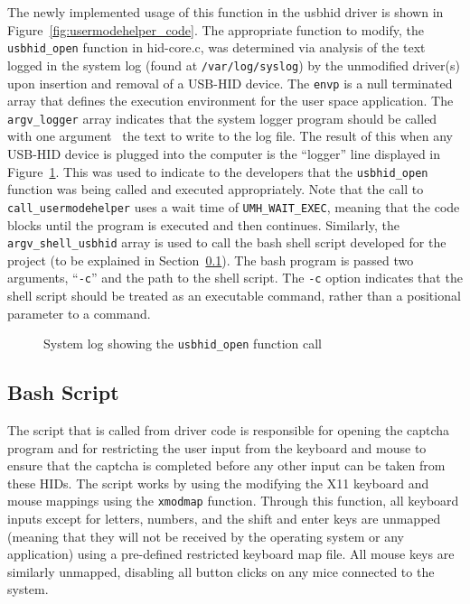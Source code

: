 \documentclass[pagenumbers]{ieee}
\begin{document}
The newly implemented usage of this function in the usbhid driver is shown in Figure~\ref{fig:usermodehelper_code}. The appropriate function to modify, the \texttt{usbhid\_open} function in hid-core.c, was determined via analysis of the text logged in the system log (found at \texttt{/var/log/syslog}) by the unmodified driver(s) upon insertion and removal of a USB-HID device. The \texttt{envp} is a null terminated array that defines the execution environment for the user space application. The \texttt{argv\_logger} array indicates that the system logger program should be called with one argument \textemdash \ the text to write to the log file. The result of this when any USB-HID device is plugged into the computer is the ``logger'' line displayed in  Figure~\ref{fig:syslog}. This was used to indicate to the developers that the \texttt{usbhid\_open} function was being called and executed appropriately. Note that the call to \texttt{call\_usermodehelper} uses a wait time of \texttt{UMH\_WAIT\_EXEC}, meaning that the code blocks until the program is executed and then continues. Similarly, the \texttt{argv\_shell\_usbhid} array is used to call the bash shell script developed for the project (to be explained in Section~\ref{section:bash}). The bash program is passed two arguments, ``\texttt{-c}'' and the path to the shell script. The \texttt{-c} option indicates that the shell script should be treated as an executable command, rather than a positional parameter to a command.

\begin{figure}[H]
   \caption{System log showing the \texttt{usbhid\_open} function call}
   \label{fig:syslog}
\end{figure}


\subsection{Bash Script}
\label{section:bash}

The script that is called from driver code is responsible for opening the captcha program and for restricting the user input from the keyboard and mouse to ensure that the captcha is completed before any other input can be taken from these HIDs.  The script works by using the modifying the X11 keyboard and mouse mappings using the \texttt{xmodmap} function. Through this function, all keyboard inputs except for letters, numbers, and the shift and enter keys are unmapped (meaning that they will not be received by the operating system or any application) using a pre-defined restricted keyboard map file. All mouse keys are similarly unmapped, disabling all button clicks on any mice connected to the system. 
\end{document}
